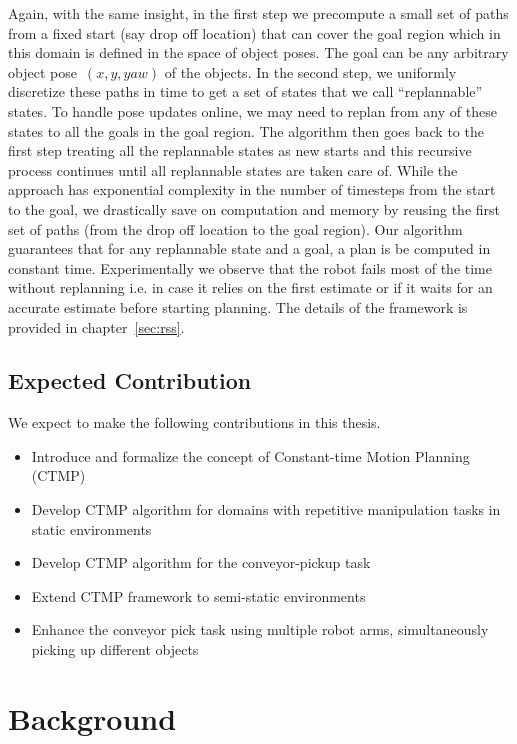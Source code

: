 \documentclass[a4paper]{report}
\begin{document}
Again, with the same insight, in the first step we precompute a small set of paths from a fixed start (say drop off location) that can cover the goal region which in this domain is defined in the space of object poses. The goal can be any arbitrary object pose~$(x,y,yaw)$ of the objects. In the second step, we uniformly discretize these paths in time to get a set of states that we call ``replannable'' states. To handle pose updates online, we may need to replan from any of these states to all the goals in the goal region. The algorithm then goes back to the first step treating all the replannable states as new starts and this recursive process continues until all replannable states are taken care of. While the approach has exponential complexity in the number of timesteps from the start to the goal, we drastically save on computation and memory by reusing the first set of paths (from the drop off location to the goal region). Our algorithm guarantees that for any replannable state and a goal, a plan is be computed in constant time. Experimentally we observe that the robot fails most of the time without replanning i.e. in case it relies on the first estimate or if it waits for an accurate estimate before starting planning. The details of the framework is provided in chapter~\ref{sec:rss}.

\section{Expected Contribution}
We expect to make the following contributions in this thesis.
\begin{itemize}
	\item Introduce and formalize the concept of Constant-time Motion Planning (CTMP)
	\item Develop CTMP algorithm for domains with repetitive manipulation tasks in static environments
	\item Develop CTMP algorithm for the conveyor-pickup task
	\item Extend CTMP framework to semi-static environments
	\item Enhance the conveyor pick task using multiple robot arms, simultaneously picking up different objects
\end{itemize}

\newpage
\chapter{Background}
\end{document}
